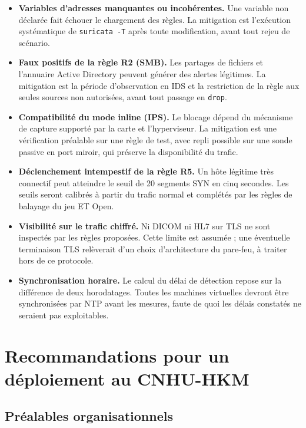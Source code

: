 \begin{itemize}
\item \textbf{Variables d'adresses manquantes ou incohérentes.} Une variable non déclarée fait échouer le chargement des règles. La mitigation est l'exécution systématique de \texttt{suricata -T} après toute modification, avant tout rejeu de scénario.
\item \textbf{Faux positifs de la règle R2 (SMB).} Les partages de fichiers et l'annuaire Active Directory peuvent générer des alertes légitimes. La mitigation est la période d'observation en IDS et la restriction de la règle aux seules sources non autorisées, avant tout passage en \texttt{drop}.
\item \textbf{Compatibilité du mode inline (IPS).} Le blocage dépend du mécanisme de capture supporté par la carte et l'hyperviseur. La mitigation est une vérification préalable sur une règle de test, avec repli possible sur une sonde passive en port miroir, qui préserve la disponibilité du trafic.
\item \textbf{Déclenchement intempestif de la règle R5.} Un hôte légitime très connectif peut atteindre le seuil de 20 segments SYN en cinq secondes. Les seuils seront calibrés à partir du trafic normal et complétés par les règles de balayage du jeu ET Open.
\item \textbf{Visibilité sur le trafic chiffré.} Ni DICOM ni HL7 sur TLS ne sont inspectés par les règles proposées. Cette limite est assumée ; une éventuelle terminaison TLS relèverait d'un choix d'architecture du pare-feu, à traiter hors de ce protocole.
\item \textbf{Synchronisation horaire.} Le calcul du délai de détection repose sur la différence de deux horodatages. Toutes les machines virtuelles devront être synchronisées par NTP avant les mesures, faute de quoi les délais constatés ne seraient pas exploitables.
\end{itemize}


\section{Recommandations pour un déploiement au CNHU-HKM}

\subsection{Préalables organisationnels}


